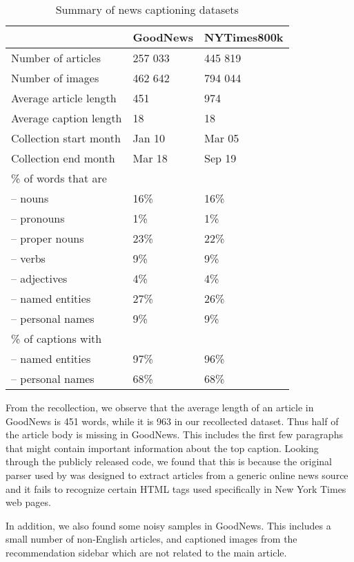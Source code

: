 \documentclass[10pt,twocolumn,letterpaper]{article}
\begin{document}
\begin{table}[t]
	\caption {Summary of news captioning datasets}
	\label{tab:datasets}
	\centering
	\begin{tabularx}{\linewidth}{lXX}
		\toprule
		  & GoodNews  &   NYTimes800k \\
		\midrule
      Number of articles & 257 033 & 445 819 \\
      Number of images   & 462 642 & 794 044 \\
      Average article length & 451 & 974 \\
      Average caption length & 18 & 18 \\
      Collection start month & Jan 10 & Mar 05\\
      Collection end month & Mar 18 & Sep 19 \\
      \midrule
      \% of words that are \\
      \quad -- nouns & 16\% & 16\% \\
      \quad -- pronouns & 1\% & 1\% \\
      \quad -- proper nouns & 23\% & 22\% \\
      \quad -- verbs & 9\% & 9\%  \\
      \quad -- adjectives & 4\% & 4\% \\
      \quad -- named entities & 27\% & 26\% \\
      \quad -- personal names & 9\% & 9\% \\
      \midrule
      \% of captions with \\
      \quad -- named entities & 97\% & 96\% \\
      \quad -- personal names & 68\% & 68\% \\
		\bottomrule
	\end{tabularx}
\end{table}

From the recollection, we observe that the average length of an article in
GoodNews is 451 words, while it is 963 in our recollected dataset. Thus half of
the article body is missing in GoodNews. This includes the first few paragraphs
that might contain important information about the top caption. Looking through
the publicly released code, we found that this is because the original parser
used by \cite{Biten2019GoodNews} was designed to extract articles from a
generic online news source and it fails to recognize certain HTML tags used
specifically in New York Times web pages.

In addition, we also found some noisy samples in GoodNews. This includes a
small number of non-English articles, and captioned images from the
recommendation sidebar which are not related to the main article.
\end{document}
